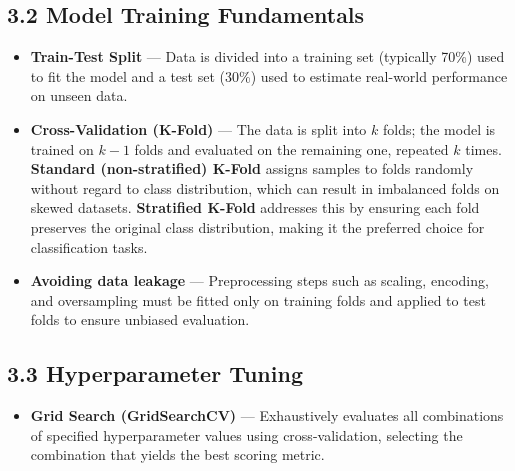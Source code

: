 \documentclass[12pt, a4paper]{article}
\begin{document}
\subsection*{3.2 Model Training Fundamentals}
\begin{itemize}
    \item \textbf{Train-Test Split} --- Data is divided into a training set (typically 70\%) used to fit the model and a test set (30\%) used to estimate real-world performance on unseen data.
    \item \textbf{Cross-Validation (K-Fold)} --- The data is split into $k$ folds; the model is trained on $k-1$ folds and evaluated on the remaining one, repeated $k$ times. \textbf{Standard (non-stratified) K-Fold} assigns samples to folds randomly without regard to class distribution, which can result in imbalanced folds on skewed datasets. \textbf{Stratified K-Fold} addresses this by ensuring each fold preserves the original class distribution, making it the preferred choice for classification tasks.
    \item \textbf{Avoiding data leakage} --- Preprocessing steps such as scaling, encoding, and oversampling must be fitted only on training folds and applied to test folds to ensure unbiased evaluation.
\end{itemize}

\subsection*{3.3 Hyperparameter Tuning}
\begin{itemize}
    \item \textbf{Grid Search (GridSearchCV)} --- Exhaustively evaluates all combinations of specified hyperparameter values using cross-validation, selecting the combination that yields the best scoring metric.
\end{itemize}
\end{document}
